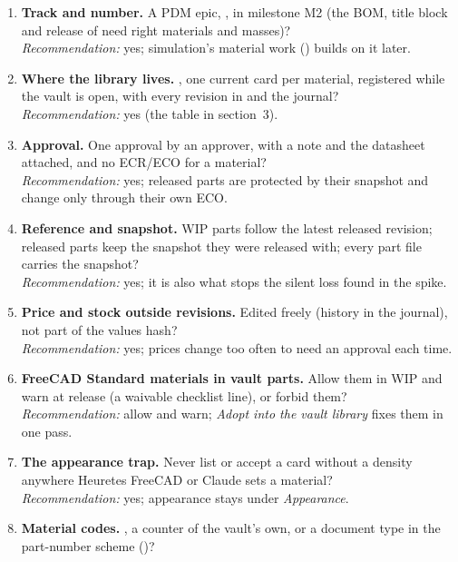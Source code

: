\begin{enumerate}
  \item \textbf{Track and number.} A PDM epic, , in milestone M2 (the BOM, title block and release of
         need right materials and masses)?\\
        \emph{Recommendation:} yes; simulation's material work () builds on it later.
  \item \textbf{Where the library lives.} , one current card per material, registered while the
        vault is open, with every revision in  and the journal?\\
        \emph{Recommendation:} yes (the table in section~3).
  \item \textbf{Approval.} One approval by an approver, with a note and the datasheet attached, and no ECR/ECO for a
        material?\\
        \emph{Recommendation:} yes; released parts are protected by their snapshot and change only through their own ECO.
  \item \textbf{Reference and snapshot.} WIP parts follow the latest released revision; released parts keep the snapshot
        they were released with; every part file carries the snapshot?\\
        \emph{Recommendation:} yes; it is also what stops the silent loss found in the spike.
  \item \textbf{Price and stock outside revisions.} Edited freely (history in the journal), not part of the values hash?\\
        \emph{Recommendation:} yes; prices change too often to need an approval each time.
  \item \textbf{FreeCAD Standard materials in vault parts.} Allow them in WIP and warn at release (a waivable checklist
        line), or forbid them?\\
        \emph{Recommendation:} allow and warn; \emph{Adopt into the vault library} fixes them in one pass.
  \item \textbf{The appearance trap.} Never list or accept a card without a density anywhere Heuretes FreeCAD or Claude sets a
        material?\\
        \emph{Recommendation:} yes; appearance stays under \emph{Appearance}.
  \item \textbf{Material codes.} , a counter of the vault's own, or a document type in the part-number
        scheme ()?\\

\end{enumerate}
